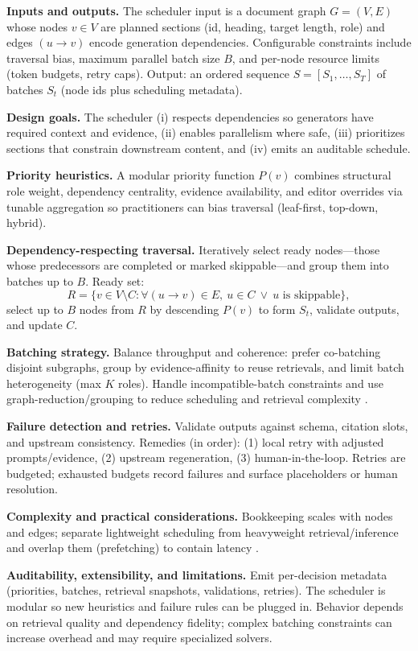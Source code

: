 \textbf{Inputs and outputs.}
The scheduler input is a document graph \(G=(V,E)\) whose nodes \(v\in V\) are planned sections (id, heading, target length, role) and edges \((u\rightarrow v)\) encode generation dependencies.
Configurable constraints include traversal bias, maximum parallel batch size \(B\), and per-node resource limits (token budgets, retry caps).
Output: an ordered sequence \(S=[S_1,\dots,S_T]\) of batches \(S_t\) (node ids plus scheduling metadata).

\textbf{Design goals.}
The scheduler (i) respects dependencies so generators have required context and evidence, (ii) enables parallelism where safe, (iii) prioritizes sections that constrain downstream content, and (iv) emits an auditable schedule.

\textbf{Priority heuristics.}
A modular priority function \(P(v)\) combines structural role weight, dependency centrality, evidence availability, and editor overrides via tunable aggregation so practitioners can bias traversal (leaf-first, top-down, hybrid).

\textbf{Dependency-respecting traversal.}
Iteratively select ready nodes—those whose predecessors are completed or marked skippable—and group them into batches up to \(B\).
Ready set:
\[
R=\{v\in V\setminus C:\forall (u\rightarrow v)\in E,\ u\in C\ \lor\ u\text{ is skippable}\},
\]
select up to \(B\) nodes from \(R\) by descending \(P(v)\) to form \(S_t\), validate outputs, and update \(C\).

\textbf{Batching strategy.}
Balance throughput and coherence: prefer co-batching disjoint subgraphs, group by evidence-affinity to reuse retrievals, and limit batch heterogeneity (max \(K\) roles).
Handle incompatible-batch constraints and use graph-reduction/grouping to reduce scheduling and retrieval complexity \cite{web_huertas_2024_parallel_batch_scheduling_with_incompatible_job_,web_mostafa_2024_intent_aware_drl_based_noma_uplink_dynamic_sched}.

\textbf{Failure detection and retries.}
Validate outputs against schema, citation slots, and upstream consistency. Remedies (in order): (1) local retry with adjusted prompts/evidence, (2) upstream regeneration, (3) human-in-the-loop. Retries are budgeted; exhausted budgets record failures and surface placeholders or human resolution.

\textbf{Complexity and practical considerations.}
Bookkeeping scales with nodes and edges; separate lightweight scheduling from heavyweight retrieval/inference and overlap them (prefetching) to contain latency \cite{web_sudarsan_2007_reshape_a_framework_for_dynamic_resizing_and_sch}.

\textbf{Auditability, extensibility, and limitations.}
Emit per-decision metadata (priorities, batches, retrieval snapshots, validations, retries). The scheduler is modular so new heuristics and failure rules can be plugged in. Behavior depends on retrieval quality and dependency fidelity; complex batching constraints can increase overhead and may require specialized solvers.